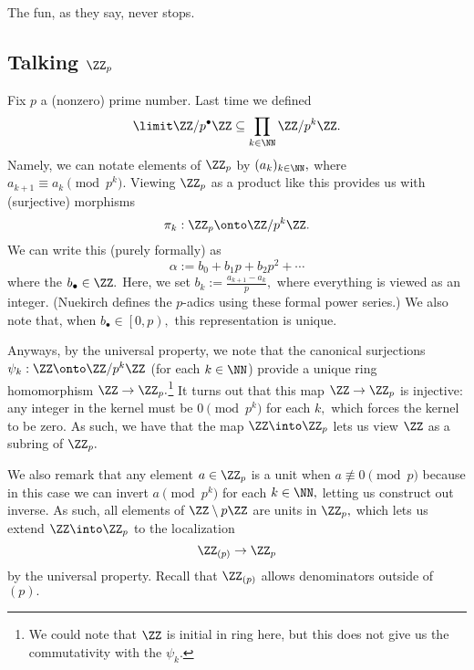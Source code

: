 \documentclass[../notes.tex]{subfiles}
\begin{document}
















The fun, as they say, never stops.

\subsection{Talking \texorpdfstring{$\ZZ_p$}{}}
Fix $p$ a (nonzero) prime number. Last time we defined
\[\limit\ZZ/p^\bullet\ZZ\subseteq\prod_{k\in\NN}\ZZ/p^k\ZZ.\]
Namely, we can notate elements of $\ZZ_p$ by $(a_k)_{k\in\NN},$ where $a_{k+1}\equiv a_k\pmod{p^k}.$ Viewing $\ZZ_p$ as a product like this provides us with (surjective) morphisms
\[\pi_k:\ZZ_p\onto\ZZ/p^k\ZZ.\]
We can write this (purely formally) as
\[\alpha:=b_0+b_1p+b_2p^2+\cdots\]
where the $b_\bullet\in\ZZ.$ Here, we set $b_k:=\frac{a_{k+1}-a_k}p,$ where everything is viewed as an integer. (Nuekirch defines the $p$-adics using these formal power series.) We also note that, when $b_\bullet\in\left[0,p\right),$ this representation is unique.

Anyways, by the universal property, we note that the canonical surjections $\psi_k:\ZZ\onto\ZZ/p^k\ZZ$ (for each $k\in\NN$) provide a unique ring homomorphism $\ZZ\to\ZZ_p.$\footnote{We could note that $\ZZ$ is initial in ring here, but this does not give us the commutativity with the $\psi_k.$} It turns out that this map $\ZZ\to\ZZ_p$ is injective: any integer in the kernel must be $0\pmod{p^k}$ for each $k,$ which forces the kernel to be zero. As such, we have that the map $\ZZ\into\ZZ_p$ lets us view $\ZZ$ as a subring of $\ZZ_p.$

We also remark that any element $a\in\ZZ_p$ is a unit when $a\not\equiv0\pmod p$ because in this case we can invert $a\pmod{p^k}$ for each $k\in\NN,$ letting us construct out inverse. As such, all elements of $\ZZ\setminus p\ZZ$ are units in $\ZZ_p,$ which lets us extend $\ZZ\into\ZZ_p$ to the localization
\[\ZZ_{(p)}\to\ZZ_p\]
by the universal property. Recall that $\ZZ_{(p)}$ allows denominators outside of $(p).$
\end{document}
